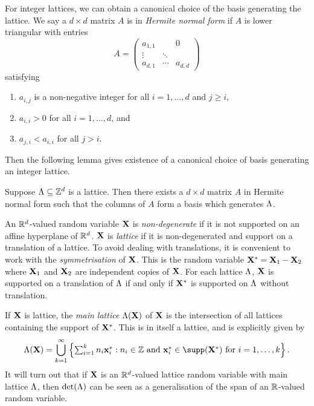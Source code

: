 For integer lattices, we can obtain a canonical choice of the basis generating the lattice. We say a $d \times d$ matrix $A$ is in \emph{Hermite normal form} if $A$ is lower triangular with entries 
\begin{equation*}
    A = \begin{pmatrix}
        a_{1, 1} &        & 0 \\
        \vdots   & \ddots &   \\
        a_{d, 1} & \cdots & a_{d, d}
    \end{pmatrix}
\end{equation*}
satisfying
\begin{enumerate}
    \item $a_{i, j}$ is a non-negative integer for all $i = 1, \ldots, d$ and $j \geq i$,
    \item $a_{i, i} > 0$ for all $i = 1, \ldots, d$, and
    \item $a_{j, i} < a_{i, i}$ for all $j > i$.
\end{enumerate}
Then the following lemma gives existence of a canonical choice of basis generating an integer lattice.
\begin{lemma}
    \label{lem:hnf-basis}
    Suppose $\Lambda \subseteq {\mathbb Z}^d$ is a lattice. Then there exists a $d \times d$ matrix $A$ in Hermite normal form such that the columns of $A$ form a basis which generates $\Lambda$.
\end{lemma}

An ${\mathbb R}^d$-valued random variable ${\mathbf X}$ is \emph{non-degenerate} if it is not supported on an affine hyperplane of ${\mathbb R}^d$. ${\mathbf X}$ is \emph{lattice} if it is non-degenerated and support on a translation of a lattice. To avoid dealing with translations, it is convenient to work with the \emph{symmetrisation} of ${\mathbf X}$. This is the random variable ${\mathbf X}^* = {\mathbf X}_1 - {\mathbf X}_2$ where ${\mathbf X}_1$ and ${\mathbf X}_2$ are independent copies of ${\mathbf X}$. For each lattice $\Lambda$, ${\mathbf X}$ is supported on a translation of $\Lambda$ if and only if ${\mathbf X}^*$ is supported on $\Lambda$ without translation.

If ${\mathbf X}$ is lattice, the \emph{main lattice} $\Lambda({\mathbf X})$ of ${\mathbf X}$ is the intersection of all lattices containing the support of ${\mathbf X}^*$. This is in itself a lattice, and is explicitly given by
\begin{equation*}
    \lattice(\vX) = \bigcup_{k=1}^{\infty} \left\{ 
        \textstyle \sum_{i=1}^k n_i \vx^*_i : \text{$n_i \in \Z$ and $\vx^*_i \in \supp(\vX^*)$ for $i = 1, \ldots, k$}
    \right\}.
\end{equation*}
It will turn out that if ${\mathbf X}$ is an ${\mathbb R}^d$-valued lattice random variable with main lattice $\Lambda$, then $\det(\Lambda)$ can be seen as a generalisation of the span of an ${\mathbb R}$-valued random variable.


